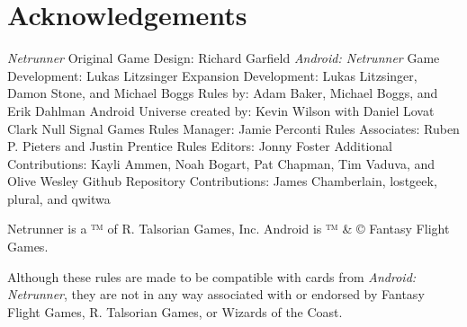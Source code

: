 \documentclass{article}
\begin{document}


\newpage

\section*{Acknowledgements}

\begin{outline}[enumerate]
\1 \emph{Netrunner} Original Game Design: Richard Garfield
\1 \emph{Android: Netrunner}
  \2 Game Development: Lukas Litzsinger
  \2 Expansion Development: Lukas Litzsinger, Damon Stone, and Michael Boggs
  \2 Rules by: Adam Baker, Michael Boggs, and Erik Dahlman
  \2 Android Universe created by: Kevin Wilson with Daniel Lovat Clark
\1 Null Signal Games
  \2 Rules Manager: Jamie Perconti
  \2 Rules Associates: Ruben P. Pieters and Justin Prentice
  \2 Rules Editors: Jonny Foster
  \2 Additional Contributions: Kayli Ammen, Noah Bogart, Pat Chapman, Tim Vaduva, and Olive Wesley
\1 Github Repository Contributions: James Chamberlain, lostgeek, plural, and qwitwa
\end{outline}

\noindent
Netrunner is a ™ of R. Talsorian Games, Inc. Android is ™ \& © Fantasy Flight Games.

\noindent
Although these rules are made to be compatible with cards from \emph{Android: Netrunner}, they are not in any way associated with or endorsed by Fantasy Flight Games, R. Talsorian Games, or Wizards of the Coast.
\end{document}
